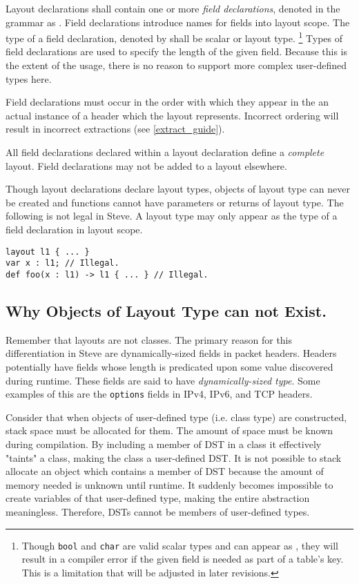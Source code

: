 Layout declarations shall contain one or more \textit{field declarations}, denoted in the grammar as . Field declarations introduce names for fields into layout scope. The type of a field declaration, denoted by  shall be scalar or layout type. \footnote{Though \texttt{bool} and \texttt{char} are valid scalar types and can appear as , they will result in a compiler error if the given field is needed as part of a table's key. This is a limitation that will be adjusted in later revisions.} Types of field declarations are used to specify the length of the given field. Because this is the extent of the usage, there is no reason to support more complex user-defined types here. 

Field declarations must occur in the order with which they appear in the an actual instance of a header which the layout represents. Incorrect ordering will result in incorrect extractions (see \ref{extract_guide}).

All field declarations declared within a layout declaration define a \textit{complete} layout. Field declarations may not be added to a layout elsewhere.

Though layout declarations declare layout types, objects of layout type can never be created and functions cannot have parameters or returns of layout type. The following is not legal in Steve. A layout type may only appear as the type of a field declaration in layout scope.

\noindent\begin{minipage}{\linewidth}
\begin{lstlisting}
layout l1 { ... }
var x : l1; // Illegal.
def foo(x : l1) -> l1 { ... } // Illegal.
\end{lstlisting}
\end{minipage}

\subsection{Why Objects of Layout Type can not Exist.}

Remember that layouts are not classes. The primary reason for this differentiation in Steve are dynamically-sized fields in packet headers. Headers potentially have fields whose length is predicated upon some value discovered during runtime. These fields are said to have \textit{dynamically-sized type}. Some examples of this are the \texttt{options} fields in IPv4, IPv6, and TCP headers. 

Consider that when objects of user-defined type (i.e. class type) are constructed, stack space must be allocated for them. The amount of space must be known during compilation. By including a member of DST in a class it effectively "taints" a class, making the class a user-defined DST. It is not possible to stack allocate an object which contains a member of DST because the amount of memory needed is unknown until runtime. It suddenly becomes impossible to create variables of that user-defined type, making the entire abstraction meaningless. Therefore, DSTs cannot be members of user-defined types. 

